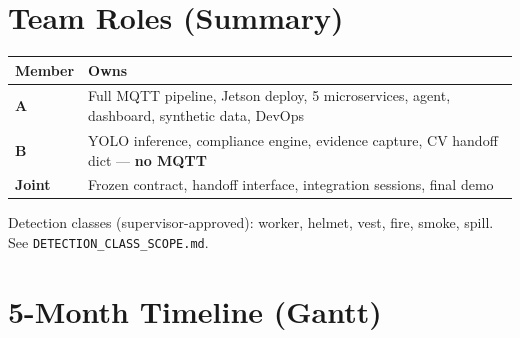 \documentclass[12pt,a4paper]{article}
\begin{document}
\section{Team Roles (Summary)}

\begin{center}
\begin{tabularx}{\textwidth}{lX}
\toprule
\rowcolor{primary!20}
\textbf{Member} & \textbf{Owns} \\
\midrule
\textbf{A} & Full MQTT pipeline, Jetson deploy, 5 microservices, agent, dashboard, synthetic data, DevOps \\
\textbf{B} & YOLO inference, compliance engine, evidence capture, CV handoff dict --- \textbf{no MQTT} \\
\textbf{Joint} & Frozen contract, handoff interface, integration sessions, final demo \\
\bottomrule
\end{tabularx}
\end{center}

Detection classes (supervisor-approved): worker, helmet, vest, fire, smoke, spill. See \texttt{DETECTION\_CLASS\_SCOPE.md}.

\section{5-Month Timeline (Gantt)}
\end{document}
